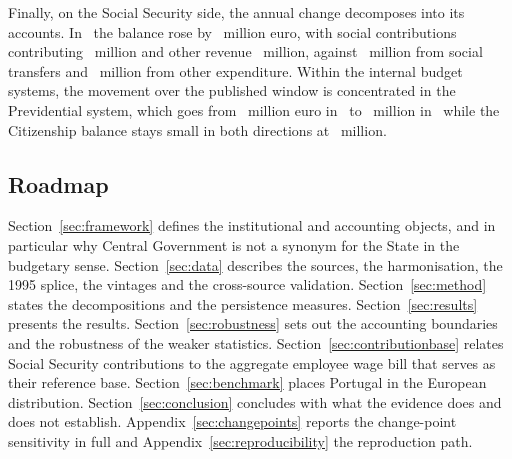 Finally, on the Social Security side, the annual change decomposes into its accounts.
In \SsfChangeYear\ the balance rose by \SsfChangeTotal\ million euro, with social
contributions contributing \SsfChangeContributions\ million and other revenue
\SsfChangeOtherRevenue\ million, against \SsfChangeTransfers\ million from social
transfers and \SsfChangeOtherExpenditure\ million from other expenditure. Within the
internal budget systems, the movement over the published window is concentrated in
the Previdential system, which goes from \PrevidentialFirst\ million euro in
\PrevidentialFirstYear\ to \PrevidentialLatest\ million in \LatestYear\ while the
Citizenship balance stays small in both directions at \CitizenshipLatest\ million.

\subsection{Roadmap}

Section~\ref{sec:framework} defines the institutional and accounting objects, and
in particular why Central Government is not a synonym for the State in the
budgetary sense. Section~\ref{sec:data} describes the sources, the harmonisation,
the 1995 splice, the vintages and the cross-source validation.
Section~\ref{sec:method} states the decompositions and the persistence measures.
Section~\ref{sec:results} presents the results. Section~\ref{sec:robustness} sets
out the accounting boundaries and the robustness of the weaker statistics.
Section~\ref{sec:contributionbase} relates Social Security contributions to the
aggregate employee wage bill that serves as their reference base.
Section~\ref{sec:benchmark} places Portugal in the European
distribution.
Section~\ref{sec:conclusion} concludes with what the evidence does and does not
establish. Appendix~\ref{sec:changepoints} reports the change-point sensitivity in
full and Appendix~\ref{sec:reproducibility} the reproduction path.
